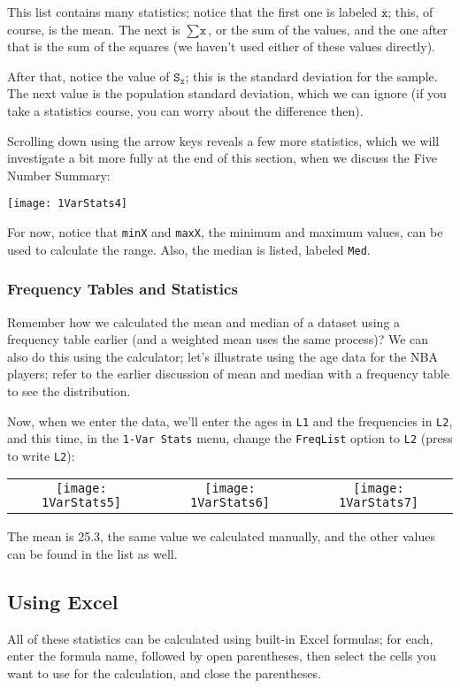 This list contains many statistics; notice that the first one is labeled $\overline{\texttt{x}}$; this, of course, is the mean.  The next is $\sum\texttt{x}$, or the sum of the values, and the one after that is the sum of the squares (we haven't used either of these values directly).

After that, notice the value of $\texttt{S}_\texttt{x}$; this is the standard deviation for the sample.  The next value is the population standard deviation, which we can ignore (if you take a statistics course, you can worry about the difference then).

Scrolling down using the arrow keys reveals a few more statistics, which we will investigate a bit more fully at the end of this section, when we discuss the Five Number Summary:
\begin{center}
\texttt{[image: 1VarStats4]}
\end{center}
For now, notice that \texttt{minX} and \texttt{maxX}, the minimum and maximum values, can be used to calculate the range.  Also, the median is listed, labeled \texttt{Med}.

\subsubsection{Frequency Tables and Statistics}
Remember how we calculated the mean and median of a dataset using a frequency table earlier (and a weighted mean uses the same process)?  We can also do this using the calculator; let's illustrate using the age data for the NBA players; refer to the earlier discussion of mean and median with a frequency table to see the distribution.
\pagebreak

Now, when we enter the data, we'll enter the ages in \texttt{L1} and the frequencies in \texttt{L2}, and this time, in the \texttt{1-Var Stats} menu, change the \texttt{FreqList} option to \texttt{L2} (press   to write \texttt{L2}):
\begin{center}
\begin{tabular}{c c c}
\texttt{[image: 1VarStats5]}
& \texttt{[image: 1VarStats6]}
& \texttt{[image: 1VarStats7]}
\end{tabular}
\end{center}

The mean is 25.3, the same value we calculated manually, and the other values can be found in the list as well.

\subsection{Using Excel}
All of these statistics can be calculated using built-in Excel formulas; for each, enter the formula name, followed by open parentheses, then select the cells you want to use for the calculation, and close the parentheses.

